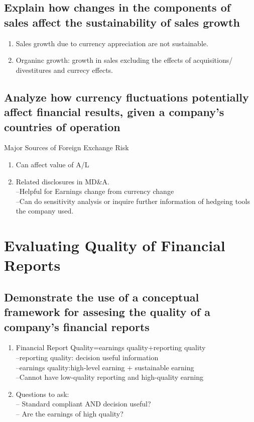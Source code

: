 \documentclass{article}
\newcommand{\be}{\begin{enumerate}}
\newcommand{\ee}{\end{enumerate}}
\begin{document}
\subsection{Explain how changes in the components of sales affect the sustainability 
of sales growth}
\be
    \item Sales growth due to currency appreciation are not sustainable.
    \item Organinc growth: growth in sales excluding the effects of acquisitions/
        divestitures and currecy effects.
\ee
\subsection{Analyze how currency fluctuations potentially affect financial results,
given a company's countries of operation}
Major Sources of Foreign Exchange Risk
\be
    \item Can affect value of A/L
    \item Related disclosures in MD\&A. 
        \\--Helpful for Earnings change from currency change
        \\--Can do sensitivity analysis or inquire further information of hedgeing
        tools the company used.
\ee

\section{Evaluating Quality of Financial Reports}
\subsection{Demonstrate the use of a conceptual framework for assesing the quality
of a company's financial reports}
\be
    \item Financial Report Quality=earnings quality+reporting quality
        \\--reporting quality: decision useful information
        \\--earnings quality:high-level earning + sustainable earning
        \\--Cannot have low-quality reporting and high-quality earning
    \item Questions to ask:
        \\-- Standard compliant AND decision useful?
        \\-- Are the earnings of high quality?
\ee
\end{document}
